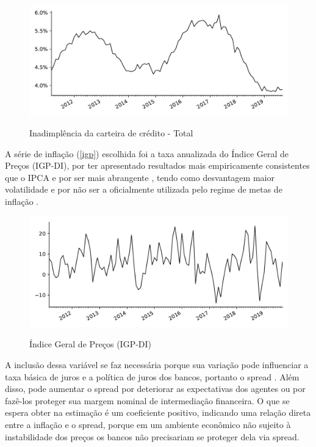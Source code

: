 \documentclass[a4paper,
               article,
               12pt,
               openany,
               oneside,
               english,
               brazil]{abntex2}
\numberwithin{equation}{section}
\begin{document}
    \begin{figure}[htb]
        \centering
        \caption{Inadimplência da carteira de crédito - Total}
        \includegraphics[width = \textwidth, scale=0.75]{inad.pdf}
        \label{inad}
    \end{figure}

    A série de inflação (\autoref{igp}) escolhida foi a taxa anualizada do Índice Geral de Preços (IGP-DI), por ter apresentado resultados mais empiricamente consistentes que o IPCA \cite[p.~66]{rocha09} e por ser mais abrangente \cite[p.~21]{afanasieff02}, tendo como desvantagem maior volatilidade e por não ser a oficialmente utilizada pelo regime de metas de inflação \cite[23]{chaim}.

\begin{figure}[h]
  \centering
    \caption{Índice Geral de Preços (IGP-DI)}
      \includegraphics[width = \textwidth, scale=0.75]{igp.pdf}
      \label{igp}
\end{figure}
    
    A inclusão dessa variável se faz necessária porque sua variação pode influenciar a taxa básica de juros e a política de juros dos bancos, portanto o spread \cite[p.~14]{bignotto06}. Além disso, pode aumentar o spread por deteriorar as expectativas dos agentes ou por fazê-los proteger sua margem nominal de intermediação financeira. O que se espera obter na estimação é um coeficiente positivo, indicando uma relação direta entre a inflação e o spread, porque em um ambiente econômico não sujeito à instabilidade dos preços os bancos não precisariam se proteger dela via spread. 
    
\end{document}
